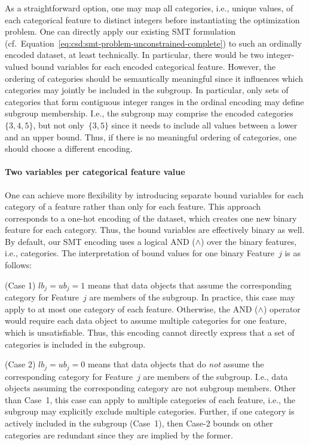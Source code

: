 \documentclass{article}
\theoremstyle{definition}
\begin{document}
As a straightforward option, one may map all categories, i.e., unique values, of each categorical feature to distinct integers before instantiating the optimization problem.
One can directly apply our existing SMT formulation (cf.~Equation~\ref{eq:csd:smt-problem-unconstrained-complete}) to such an ordinally encoded dataset, at least technically.
In particular, there would be two integer-valued bound variables for each encoded categorical feature.
However, the ordering of categories should be semantically meaningful since it influences which categories may jointly be included in the subgroup.
In particular, only sets of categories that form contiguous integer ranges in the ordinal encoding may define subgroup membership.
I.e., the subgroup may comprise the encoded categories~$\{3,4,5\}$, but not only~$\{3,5 \}$ since it needs to include all values between a lower and an upper bound.
Thus, if there is no meaningful ordering of categories, one should choose a different encoding.

\paragraph{Two variables per categorical feature value}

One can achieve more flexibility by introducing separate bound variables for each category of a feature rather than only for each feature.
This approach corresponds to a one-hot encoding of the dataset, which creates one new binary feature for each category.
Thus, the bound variables are effectively binary as well.
By default, our SMT encoding uses a logical AND ($\land$) over the binary features, i.e., categories.
The interpretation of bound values for one binary Feature~$j$ is as follows:

(Case 1) $\mathit{lb}_j = \mathit{ub}_j = 1$ means that data objects that assume the corresponding category for Feature~$j$ are members of the subgroup.
In practice, this case may apply to at most one category of each feature.
Otherwise, the AND ($\land$) operator would require each data object to assume multiple categories for one feature, which is unsatisfiable.
Thus, this encoding cannot directly express that a set of categories is included in the subgroup.

(Case 2) $\mathit{lb}_j = \mathit{ub}_j = 0$ means that data objects that do \emph{not} assume the corresponding category for Feature~$j$ are members of the subgroup.
I.e., data objects assuming the corresponding category are not subgroup members.
Other than Case~1, this case can apply to multiple categories of each feature, i.e., the subgroup may explicitly exclude multiple categories.
Further, if one category is actively included in the subgroup (Case~1), then Case-2 bounds on other categories are redundant since they are implied by the former.
\end{document}

